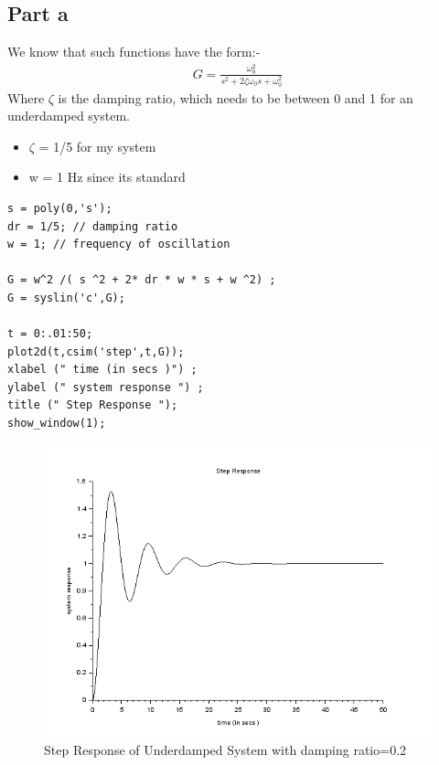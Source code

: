 \documentclass[12pt]{article}
\begin{document}
\subsection*{Part a}  
    We know that such functions have the form:-
    \begin{align*}
        G = \frac{\omega_0^2}{s^2+2\zeta\omega_0s+\omega_0^2}
    \end{align*}
    Where $\zeta$ is the damping ratio, which needs to be between 0 and 1 for an underdamped system. 
\begin{itemize}
\item $\zeta$ = 1/5 for my system
\item w = 1 Hz since its standard
\end{itemize}
    \begin{verbatim}
s = poly(0,'s');
dr = 1/5; // damping ratio
w = 1; // frequency of oscillation

G = w^2 /( s ^2 + 2* dr * w * s + w ^2) ;
G = syslin('c',G);

t = 0:.01:50;
plot2d(t,csim('step',t,G));
xlabel (" time (in secs )") ;
ylabel (" system response ") ;
title (" Step Response ");
show_window(1);
    \end{verbatim}
    \begin{figure}[H]
        \centering
        \includegraphics[scale=0.8]{q2_a}
        \caption{Step Response of Underdamped System with damping ratio=0.2}
        \label{fig:my_label}
    \end{figure}
 
\end{document}
